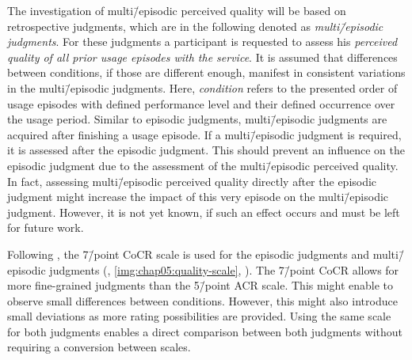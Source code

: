 The investigation of multi\=/episodic perceived quality will be based on retrospective judgments, which are in the following denoted as \emph{multi\=/episodic judgments}.
For these judgments a participant is requested to assess his \emph{perceived quality of all prior usage episodes with the service}.
It is assumed that differences between conditions, if those are different enough, manifest in consistent variations in the multi\=/episodic judgments.
Here, \emph{condition} refers to the presented order of usage episodes with defined performance level and their defined occurrence over the usage period.
Similar to episodic judgments, multi\=/episodic judgments are acquired after finishing a usage episode.
If a multi\=/episodic judgment is required, it is assessed after the episodic judgment.
This should prevent an influence on the episodic judgment due to the assessment of the multi\=/episodic perceived quality.
In fact, assessing multi\=/episodic perceived quality directly after the episodic judgment might increase the impact of this very episode on the multi\=/episodic judgment.
However, it is not yet known, if such an effect occurs and must be left for future work.

Following \citet{moller_single-call_2011}, the 7\=/point \acf{CoCR} scale is used for the episodic judgments and multi\=/episodic judgments (\cf, \autoref{img:chap05:quality-scale}, ).
The 7\=/point \ac{CoCR} allows for more fine-grained judgments than the 5\=/point \ac{ACR} scale.
This might enable to observe small differences between conditions.
However, this might also introduce small deviations as more rating possibilities are provided.
Using the same scale for both judgments enables a direct comparison between both judgments without requiring a conversion between scales.

